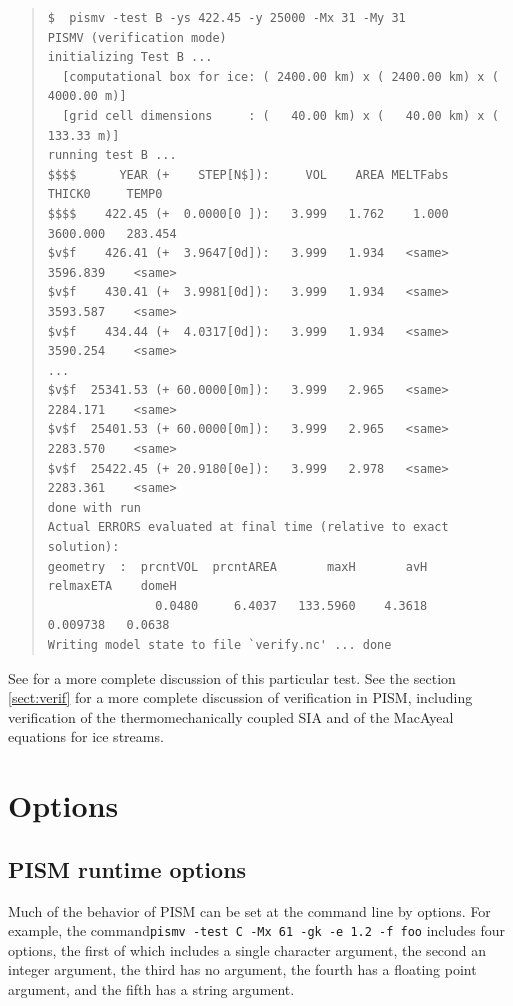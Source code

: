 \documentclass[12pt,final]{amsart}
\begin{document}
\small\begin{quote}\begin{verbatim}
$  pismv -test B -ys 422.45 -y 25000 -Mx 31 -My 31
PISMV (verification mode)
initializing Test B ...
  [computational box for ice: ( 2400.00 km) x ( 2400.00 km) x ( 4000.00 m)]
  [grid cell dimensions     : (   40.00 km) x (   40.00 km) x (  133.33 m)]
running test B ...
$$$$      YEAR (+    STEP[N$]):     VOL    AREA MELTFabs     THICK0     TEMP0
$$$$    422.45 (+  0.0000[0 ]):   3.999   1.762    1.000   3600.000   283.454
$v$f    426.41 (+  3.9647[0d]):   3.999   1.934   <same>   3596.839    <same>
$v$f    430.41 (+  3.9981[0d]):   3.999   1.934   <same>   3593.587    <same>
$v$f    434.44 (+  4.0317[0d]):   3.999   1.934   <same>   3590.254    <same>
...
$v$f  25341.53 (+ 60.0000[0m]):   3.999   2.965   <same>   2284.171    <same>
$v$f  25401.53 (+ 60.0000[0m]):   3.999   2.965   <same>   2283.570    <same>
$v$f  25422.45 (+ 20.9180[0e]):   3.999   2.978   <same>   2283.361    <same>
done with run
Actual ERRORS evaluated at final time (relative to exact solution):
geometry  :  prcntVOL  prcntAREA       maxH       avH   relmaxETA    domeH
               0.0480     6.4037   133.5960    4.3618    0.009738   0.0638
Writing model state to file `verify.nc' ... done
\end{verbatim}
\end{quote}\normalsize

See \cite{BLKCB} for a more complete discussion of this particular test.  See the section \ref{sect:verif} for a more complete discussion of verification in PISM, including verification of the thermomechanically coupled SIA and of the MacAyeal equations for ice streams.


\newcommand{\rawopt}[1]{\vspace{1mm}\noindent \large\texttt{-#1}\normalsize}
\newcommand{\opt}[1]{\rawopt{#1}\,:\quad}
\newcommand{\optdef}[2]{\rawopt{#1}\,[\textsl{#2}]:\quad}
\newcommand{\optrestrict}[2]{\rawopt{#1}\,[\texttt{#2} \textsl{only}]:\quad}
\newcommand{\optdefrestrict}[3]{\rawopt{#1}\,[\textsl{#2}]\,[\texttt{#3} \textsl{only}]:\quad}
\newcommand{\und}{$\underline{\,\,\,}$}

\clearpage\newpage
\section{Options}\label{sect:options}

\subsection{PISM runtime options}  Much of the behavior of PISM can be set at the command line by options.  For example, the command\verb|pismv -test C -Mx 61 -gk -e 1.2 -f foo| includes four options, the first of which includes a single character argument, the second an integer argument, the third has no argument, the fourth has a floating point argument, and the fifth has a string argument.
\end{document}
